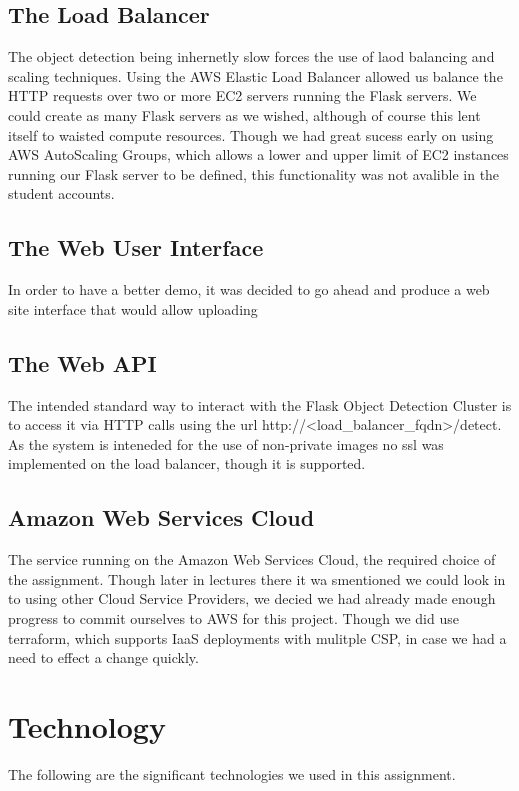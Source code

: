 \documentclass[conference]{IEEEtran}
\begin{document}
\subsection{The Load Balancer}
The object detection being inhernetly slow forces the use of laod balancing and scaling techniques. Using the AWS Elastic Load Balancer allowed us balance the HTTP requests over two or more EC2 servers running the Flask servers. We could create as many Flask servers as we wished, although of course this lent itself to waisted compute resources. Though we had great sucess early on using AWS AutoScaling Groups, which allows a lower and upper limit of EC2 instances running our Flask server to be defined, this functionality was not avalible in the student accounts.
\subsection{The Web User Interface}
In order to have a better demo, it was decided to go ahead and produce a web site interface that would allow uploading 
\subsection{The Web API}
The intended standard way to interact with the Flask Object Detection Cluster is to access it via HTTP calls using the url http://\textless load\_balancer\_fqdn\textgreater/detect. As the system is inteneded for the use of non-private images no ssl was implemented on the load balancer, though it is supported.
\subsection{Amazon Web Services Cloud}
The service running on the Amazon Web Services Cloud, the required choice of the assignment. Though later in lectures there it wa smentioned we could look in to using other Cloud Service Providers, we decied we had already made enough progress to commit ourselves to AWS for this project. Though we did use terraform, which supports IaaS deployments with mulitple CSP, in case we had a need to effect a change quickly.

\section{Technology}
The following are the significant technologies we used in this assignment.
\end{document}
